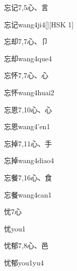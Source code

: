 \begin{Entry}{忘记}{7,5}{⼼、⾔}
  \begin{Phonetics}{忘记}{wang4ji4}[][HSK 1]
  \end{Phonetics}
\end{Entry}

\begin{Entry}{忘却}{7,7}{⼼、⼙}
  \begin{Phonetics}{忘却}{wang4que4}
  \end{Phonetics}
\end{Entry}

\begin{Entry}{忘怀}{7,7}{⼼、⼼}
  \begin{Phonetics}{忘怀}{wang4huai2}
  \end{Phonetics}
\end{Entry}

\begin{Entry}{忘恩}{7,10}{⼼、⼼}
  \begin{Phonetics}{忘恩}{wang4'en1}
  \end{Phonetics}
\end{Entry}

\begin{Entry}{忘掉}{7,11}{⼼、⼿}
  \begin{Phonetics}{忘掉}{wang4diao4}
  \end{Phonetics}
\end{Entry}

\begin{Entry}{忘餐}{7,16}{⼼、⾷}
  \begin{Phonetics}{忘餐}{wang4can1}
  \end{Phonetics}
\end{Entry}

\begin{Entry}{忧}{7}{⼼}
  \begin{Phonetics}{忧}{you1}
  \end{Phonetics}
\end{Entry}

\begin{Entry}{忧郁}{7,8}{⼼、⾢}
  \begin{Phonetics}{忧郁}{you1yu4}
  \end{Phonetics}
\end{Entry}

